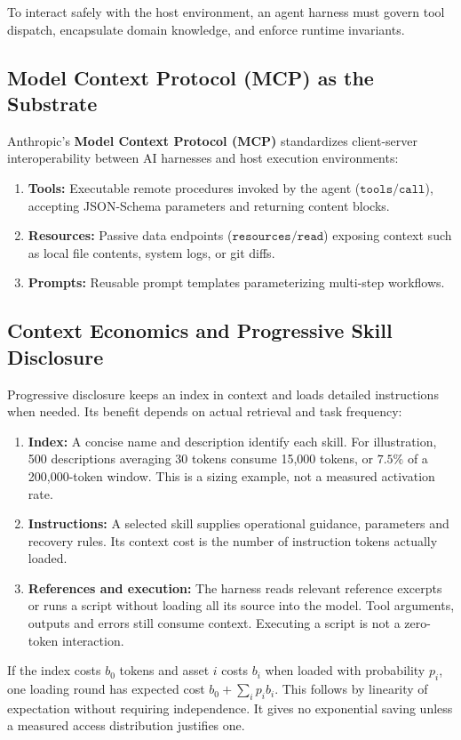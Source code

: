 \documentclass[11pt,a4paper]{article}
\begin{document}
To interact safely with the host environment, an agent harness must govern tool dispatch, encapsulate domain knowledge, and enforce runtime invariants.

\subsection{Model Context Protocol (MCP) as the Substrate}

Anthropic's \textbf{Model Context Protocol (MCP)} standardizes client-server interoperability between AI harnesses and host execution environments:
\begin{enumerate}[leftmargin=1.8em,itemsep=2pt]
  \item \textbf{Tools:} Executable remote procedures invoked by the agent ($\mathtt{tools/call}$), accepting JSON-Schema parameters and returning content blocks.
  \item \textbf{Resources:} Passive data endpoints ($\mathtt{resources/read}$) exposing context such as local file contents, system logs, or git diffs.
  \item \textbf{Prompts:} Reusable prompt templates parameterizing multi-step workflows.
\end{enumerate}

\subsection{Context Economics and Progressive Skill Disclosure}

Progressive disclosure keeps an index in context and loads detailed instructions when needed. Its benefit depends on actual retrieval and task frequency:
\begin{enumerate}[leftmargin=1.8em,itemsep=3pt]
  \item \textbf{Index:} A concise name and description identify each skill. For illustration, 500 descriptions averaging 30 tokens consume 15,000 tokens, or $7.5\%$ of a 200,000-token window. This is a sizing example, not a measured activation rate.
  \item \textbf{Instructions:} A selected skill supplies operational guidance, parameters and recovery rules. Its context cost is the number of instruction tokens actually loaded.
  \item \textbf{References and execution:} The harness reads relevant reference excerpts or runs a script without loading all its source into the model. Tool arguments, outputs and errors still consume context. Executing a script is not a zero-token interaction.
\end{enumerate}
If the index costs $b_0$ tokens and asset $i$ costs $b_i$ when loaded with probability $p_i$, one loading round has expected cost $b_0+\sum_i p_i b_i$. This follows by linearity of expectation without requiring independence. It gives no exponential saving unless a measured access distribution justifies one.
\end{document}

